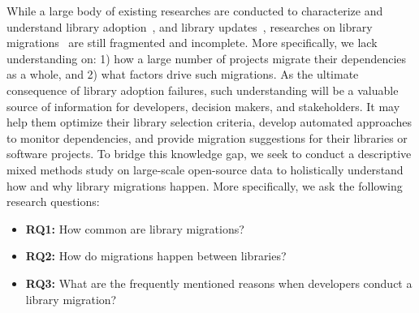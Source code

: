 \documentclass[sigconf, screen]{acmart}
\begin{document}
While a large body of existing researches are conducted to characterize and understand library adoption~\cite{pano2018factors, de2018library, de2018empirical, kavaler2019tool, yin2020team, larios2020selecting, ma2020methodology, xu2020reinventing, lamba2020heard},
and library updates~\cite{cox2015measuring, kula2015trusting, bavota2015apache, mirhosseini2017can, kula2018developers, zerouali2018empirical, decan2018evolution, cogo2019empirical, soto2019emergence, dietrich2019dependency, zimmermann2019small}, 
researches on library migrations~\cite{bartolomei2009study, bartolomei2010swing, kabinna2016logging, alrubaye2020does, teyton2012mining, teyton2014study} are still %
fragmented and incomplete.
More specifically, we lack understanding on: 1) how a large number of projects migrate their dependencies as a whole, and 2) what factors drive such migrations.
As the ultimate consequence of library adoption failures, such understanding will be a valuable source of information for developers, decision makers, and stakeholders.
It may help them optimize their library selection criteria, develop automated approaches to monitor dependencies, and provide migration suggestions for their libraries or software projects.
To bridge this knowledge gap, we seek to conduct a descriptive mixed methods study on large-scale open-source data to holistically understand how and why library migrations happen. More specifically, we ask the following research questions:
\begin{itemize}
    \item \textbf{RQ1:} How common are library migrations?
    \item \textbf{RQ2:} How do migrations happen between libraries?
    \item \textbf{RQ3:} What are the frequently mentioned reasons when developers conduct a library migration?
\end{itemize}
\end{document}
